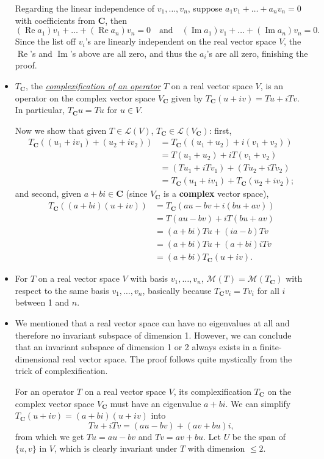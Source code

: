 \documentclass{article}
\newcommand{\df}[1]{\ul{\textit{#1}}}
\newcommand{\C}{\mathbf{C}}
\renewcommand{\Re}{\operatorname{Re}}
\renewcommand{\Im}{\operatorname{Im}}
\newcommand{\LV}{\mathcal{L}(V)}
\newcommand{\M}{\mathcal{M}}
\begin{document}
\begin{itemize}
    Regarding the linear independence of $v_1,\dots,v_n$, suppose $a_1v_1+\dots+a_nv_n = 0$ with coefficients from $\C$, then 
    \[(\Re a_1)v_1+ \dots + (\Re a_n)v_n = 0 \quad \text{and} \quad (\Im a_1)v_1 + \dots + (\Im a_n)v_n = 0.\]
    Since the list off $v_i$'s are linearly independent on the real vector space $V$, the $\Re$'s and $\Im$'s above are all zero, and thus the $a_i$'s are all zero, finishing the proof.
    \item $T_\C$, the \df{complexification of an operator} $T$ on a real vector space $V$, is an operator on the complex vector space $V_\C$ given by $T_\C (u+iv) = Tu + i Tv$. In particular, $T_\C u = Tu$ for $u \in V$.

    Now we show that given $T \in \LV$, $T_\C \in \mathcal{L}(V_\C)$: first, \begin{align*}
        T_\C((u_1+iv_1)+(u_2+iv_2)) & = T_\C((u_1+u_2)+i(v_1+v_2)) \\ & = T(u_1+u_2) + iT(v_1+v_2) \\ & = (Tu_1 + iTv_1) + (Tu_2 + iTv_2) \\ & = T_\C(u_1 + iv_1) + T_\C(u_2 + iv_2);
    \end{align*}
    and second, given $a+bi \in \C$ (since $V_\C$ is a \textbf{complex} vector space),
    \begin{align*}
        T_\C((a+bi)(u+iv)) & = T_\C(au-bv + i(bu+av)) \\ & = T(au-bv) + iT(bu+av) \\ & = (a+bi)Tu+(ia-b)Tv \\ & = (a+bi)Tu + (a+bi)iTv \\ & = (a+bi) T_\C(u+iv).
    \end{align*}
    \item For $T$ on a real vector space $V$ with basis $v_1,\dots,v_n$, $\M(T) = \M(T_\C)$ with respect to the same basis $v_1,\dots,v_n$, basically because $T_\C v_i = Tv_i$ for all $i$ between 1 and $n$.
    \item We mentioned that a real vector space can have no eigenvalues at all and therefore no invariant subspace of dimension 1. However, we can conclude that an invariant subspace of dimension 1 or 2 always exists in a finite-dimensional real vector space. The proof follows quite mystically from the trick of complexification.

    For an operator $T$ on a real vector space $V$, its complexification $T_\C$ on the complex vector space $V_\C$ must have an eigenvalue $a+bi$. We can simplify $T_\C(u+iv) = (a+bi)(u+iv)$ into \[Tu+iTv = (au-bv)+(av+bu)i,\] from which we get $Tu = au-bv$ and $Tv = av+bu$. Let $U$ be the span of $\{u,v\}$ in $V$, which is clearly invariant under $T$ with dimension $\leq 2$.
    

\end{itemize}
\end{document}
